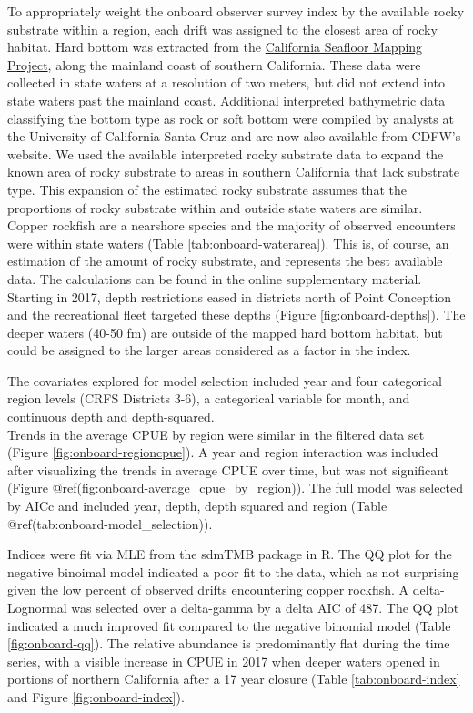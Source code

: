 \documentclass[11pt,
  english,
  letterpaper,
]{article}
\begin{document}
To appropriately weight the onboard observer survey index by the available rocky substrate within a region, each drift was assigned to the closest area of rocky habitat. Hard bottom was extracted from the \href{http://seafloor.otterlabs.org/index.html}{California Seafloor Mapping Project}, along the mainland coast of southern California. These data were collected in state waters at a resolution of two meters, but did not extend into state waters past the mainland coast. Additional interpreted bathymetric data classifying the bottom type as rock or soft bottom were compiled by analysts at the University of California Santa Cruz and are now also available from CDFW's website. We used the available interpreted rocky substrate data to expand the known area of rocky substrate to areas in southern California that lack substrate type. This expansion of the estimated rocky substrate assumes that the proportions of rocky substrate within and outside state waters are similar. Copper rockfish are a nearshore species and the majority of observed encounters were within state waters (Table \ref{tab:onboard-waterarea}). This is, of course, an estimation of the amount of rocky substrate, and represents the best available data. The calculations can be found in the online supplementary material. Starting in 2017, depth restrictions eased in districts north of Point Conception and the recreational fleet targeted these depths (Figure \ref{fig:onboard-depths}). The deeper waters (40-50 fm) are outside of the mapped hard bottom habitat, but could be assigned to the larger areas considered as a factor in the index.

The covariates explored for model selection included year and four categorical region levels (CRFS Districts 3-6), a categorical variable for month, and continuous depth and depth-squared.\\
Trends in the average CPUE by region were similar in the filtered data set (Figure \ref{fig:onboard-regioncpue}). A year and region interaction was included after visualizing the trends in average CPUE over time, but was not significant (Figure @ref(fig:onboard-average\_cpue\_by\_region)). The full model was selected by AICc and included year, depth, depth squared and region (Table @ref(tab:onboard-model\_selection)).

Indices were fit via MLE from the sdmTMB package in R. The QQ plot for the negative binoimal model indicated a poor fit to the data, which as not surprising given the low percent of observed drifts encountering copper rockfish. A delta-Lognormal was selected over a delta-gamma by a delta AIC of 487. The QQ plot indicated a much improved fit compared to the negative binomial model (Table \ref{fig:onboard-qq}). The relative abundance is predominantly flat during the time series, with a visible increase in CPUE in 2017 when deeper waters opened in portions of northern California after a 17 year closure (Table \ref{tab:onboard-index} and Figure \ref{fig:onboard-index}).
\end{document}
